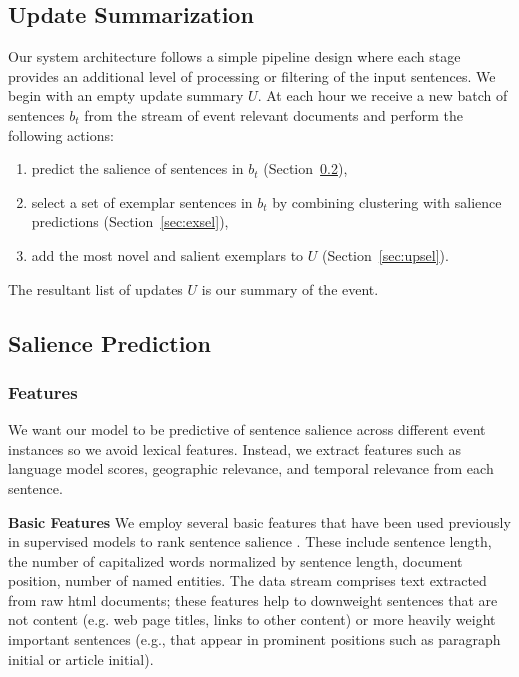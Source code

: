 \subsection{Update Summarization}

Our system architecture follows a simple pipeline design where each
stage provides an additional level of processing or filtering of the input
sentences.
We begin with an empty update summary $U$.
At each hour we receive a new batch of sentences $b_t$ from the stream
of event relevant documents
and perform the following actions:
\begin{enumerate}[nosep]
  \item predict the salience of sentences in $b_t$ (Section~\ref{sec:salpred}),
  \item select a set of exemplar sentences in $b_t$ by combining 
      clustering with 
      salience predictions (Section~\ref{sec:exsel}),
  \item add the most novel and salient exemplars 
      to $U$ (Section~\ref{sec:upsel}).
\end{enumerate}
The resultant list of updates $U$ is our summary of the event.


\subsection{Salience Prediction}
\label{sec:salpred}

%

\subsubsection{Features}
\label{sec:features}
We want our model to be predictive of sentence salience across different event instances so we avoid lexical features.  Instead, we extract features such as language model scores, geographic relevance, and temporal relevance from each sentence.  

\textbf{Basic Features}
We employ several basic features that have been used previously in supervised models to rank sentence salience \cite{kupiec1995trainable,conroy2001using}. These include sentence length, the number of capitalized words normalized by sentence length, document position, number of named entities.  
The data stream comprises text extracted from raw html documents;
these features help to downweight sentences that are not 
content (e.g. web page titles, links to other content) or
more heavily weight important sentences (e.g., that appear in
prominent positions such as paragraph initial or article initial).

